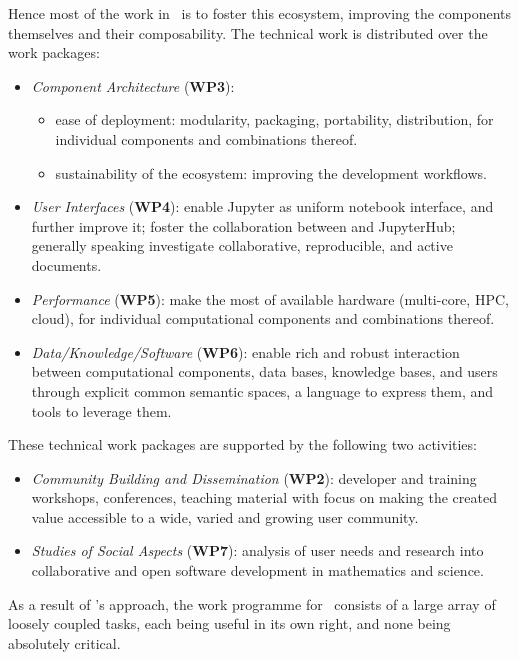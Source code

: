 Hence most of the work in \ODK\ is to foster this ecosystem, improving
the components themselves and their composability. The technical work is
distributed over the work packages:
\begin{itemize}
\item \emph{Component Architecture} (\textbf{WP3}):
  \begin{itemize}
  \item ease of deployment: modularity, packaging, portability,
    distribution, for individual components and combinations thereof.
  \item sustainability of the ecosystem: improving the development workflows.
  \end{itemize}
\item \emph{User Interfaces} (\textbf{WP4}): enable Jupyter as uniform notebook
  interface, and further improve it; foster the collaboration between
  \cocalc and JupyterHub; generally speaking investigate
  collaborative, reproducible, and active documents.
\item \emph{Performance} (\textbf{WP5}): make the most of available hardware
  (multi-core, HPC, cloud), for individual computational components and
  combinations thereof.
\item \emph{Data/Knowledge/Software} (\textbf{WP6}): enable rich and robust
  interaction between computational components, data bases, knowledge
  bases, and users through explicit common semantic spaces, a language to
  express them, and tools to leverage them.
\end{itemize}
These technical work packages are supported by the following two activities:
\begin{itemize}
\item \emph{Community Building and Dissemination} (\textbf{WP2}): developer and
  training workshops, conferences, teaching material with focus on
  making the created value accessible to a wide, varied and growing user community.
\item \emph{Studies of Social Aspects} (\textbf{WP7}): analysis of user needs and research
  into collaborative and open software development in mathematics and science.
\end{itemize}

As a result of \ODK's approach, the work programme for \ODK\ consists
of a large array of loosely coupled tasks, each being useful in its
own right, and none being absolutely critical.

